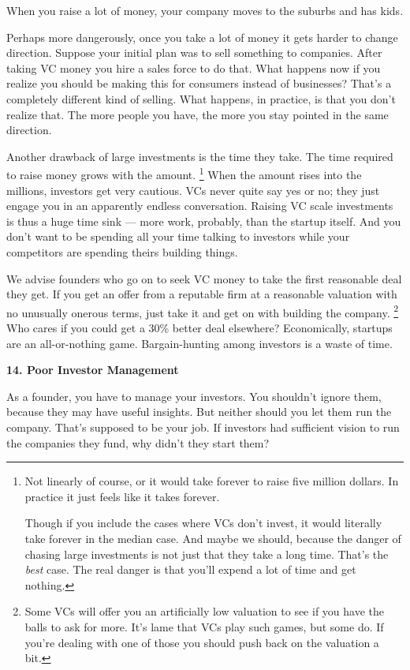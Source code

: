 \documentclass[12pt]{book}
\begin{document}
When you raise a lot of money, your company moves to the suburbs and has
kids.

Perhaps more dangerously, once you take a lot of money it gets harder to
change direction. Suppose your initial plan was to sell something to
companies. After taking VC money you hire a sales force to do that. What
happens now if you realize you should be making this for consumers
instead of businesses? That's a completely different kind of selling.
What happens, in practice, is that you don't realize that. The more
people you have, the more you stay pointed in the same direction.

Another drawback of large investments is the time they take. The time
required to raise money grows with the amount. \footnote{Not linearly of course, or it would take forever to raise five
million dollars. In practice it just feels like it takes forever.

Though if you include the cases where VCs don't invest, it would
literally take forever in the median case. And maybe we should, because
the danger of chasing large investments is not just that they take a
long time. That's the \emph{best} case. The real danger is that you'll
expend a lot of time and get nothing.}
When the amount rises into the millions, investors get very cautious.
VCs never quite say yes or no; they just engage you in an apparently
endless conversation. Raising VC scale investments is thus a huge time
sink --- more work, probably, than the startup itself. And you don't
want to be spending all your time talking to investors while your
competitors are spending theirs building things.

We advise founders who go on to seek VC money to take the first
reasonable deal they get. If you get an offer from a reputable firm at a
reasonable valuation with no unusually onerous terms, just take it and
get on with building the company. \footnote{Some VCs will offer you an artificially low valuation to see if
you have the balls to ask for more. It's lame that VCs play such games,
but some do. If you're dealing with one of those you should push back on
the valuation a bit.} Who cares if
you could get a 30\% better deal elsewhere? Economically, startups are
an all-or-nothing game. Bargain-hunting among investors is a waste of
time.

\textbf{14. Poor Investor Management}

As a founder, you have to manage your investors. You shouldn't ignore
them, because they may have useful insights. But neither should you let
them run the company. That's supposed to be your job. If investors had
sufficient vision to run the companies they fund, why didn't they start
them?
\end{document}
